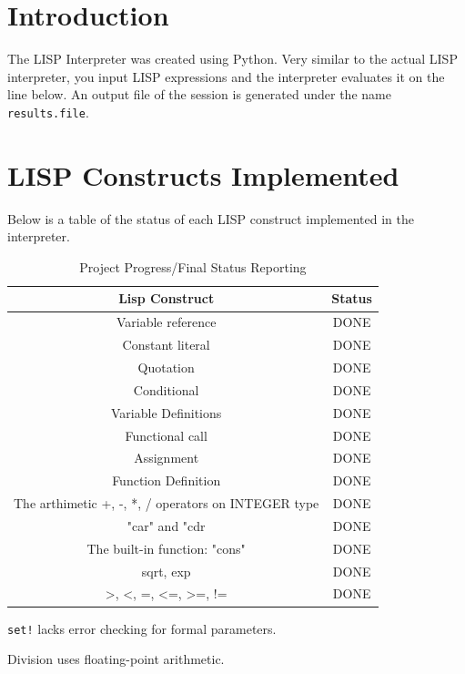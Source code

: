 \documentclass[sigconf]{acmart}
\begin{document}
\section{Introduction}
The LISP Interpreter was created using Python. Very similar to the
actual LISP interpreter, you input LISP expressions and the interpreter
evaluates it on the line below. An output file of the session is generated
under the name \texttt{results.file}.

\section{LISP Constructs Implemented}
Below is a table of the status of each LISP construct implemented in the interpreter.
\begin{table}[h!]
\begin{threeparttable}
    \caption{Project Progress/Final Status Reporting}
    \begin{tabular}{| c | c |}
    \hline
    Lisp Construct & Status \\
    \hline
    Variable reference & DONE \\
    Constant literal & DONE \\
    Quotation & DONE \\
    Conditional & DONE \\
    Variable Definitions & DONE \\
    Functional call & DONE \\
    Assignment & DONE \\
    Function Definition & DONE \\
    The arthimetic +, -, *, / operators on INTEGER type & DONE \\
    "car" and "cdr & DONE \\
    The built-in function: "cons" & DONE \\
    sqrt, exp & DONE \\
    >, <, =, <=, >=, != & DONE \\
    \hline
    \end{tabular}
    \begin{tablenotes}
      \item[1] \texttt{set!} lacks error checking for formal parameters.
      \item[2] Division uses floating-point arithmetic.
    \end{tablenotes}
    \label{tab:lispconstructs}
\end{threeparttable}
\end{table}
\end{document}

